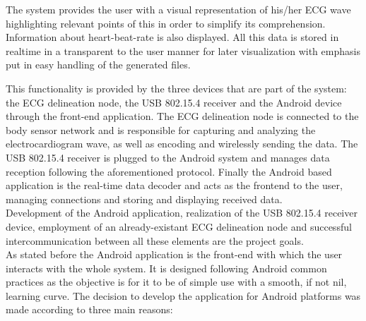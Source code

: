 		The system provides the user with a visual representation of his/her ECG wave highlighting relevant points of this in order to simplify its comprehension. Information about heart-beat-rate %
		is also displayed. All this data is stored in realtime in a transparent to the user manner for later visualization with emphasis put in easy handling of the generated files.\\

		\begin{comment}
		¿Qué es cada parte?
		Sistema 3 partes: nodo delineador, receptor 802.15.4 y app como frontend en general. En un parrafo distino para cada una explicar las tecnologías que hemos usado y porque. 

		¿Cómo se hizo cada parte?
		(Orden, android ->shimmer->msp430->dirigir texto hacia investigación(flecha = parrafo))
		Visualizador: Android ampliamente usado, facilidad para obtener un dispositivo, no demasiado coste (al menos < iOS), plataforma abierta, desarrollo comodo.
		Shimmer: reutiliza sistema desarrollado por la complu en colaboración con EPFL
		Receptor: 

		\end{comment}
		This functionality is provided by the three devices that are part of the system: the ECG delineation node, the USB 802.15.4 receiver and the Android device through the front-end application. The ECG delineation node is connected to the body sensor network and is responsible for capturing and analyzing the electrocardiogram wave, as well as encoding and wirelessly sending the data. The USB 802.15.4 receiver is plugged to the Android system and manages data reception following the aforementioned protocol. Finally the Android based application is the real-time data decoder and acts as the frontend to the user, managing connections and storing and displaying received data.\\

		Development of the Android application, realization of the USB 802.15.4 receiver device, employment of an already-existant ECG delineation node and successful intercommunication between all these elements are the project goals.\\
		
		As stated before the Android application is the front-end with which the user interacts with the whole system. It is designed following Android common practices as the objective is for it to be of simple use with a smooth, if not nil, learning curve. The decision to develop the application for Android platforms was made according to three main reasons:\\


